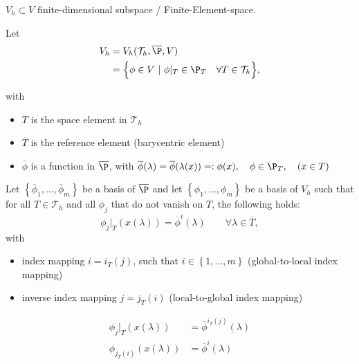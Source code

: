 $V_{h} \subset V$ finite-dimensional subspace / Finite-Element-space.

Let 
\begin{align*}
	V_{h} &= V_{h}(\mathcal{T}_{h}, \overline{\P}, V) \\
		  &= \Big\{  \phi \in V ~|~\phi |_{T} \in \P_{T}\quad\forall T \in \mathcal{T}_{h} \Big\}  ,
\end{align*}

with
\begin{itemize}
	\item $T$ is the space element in $\mathcal{T}_{h}$
	\item $\overline{T}$ is the reference element (barycentric element)
	\item $\overline{\phi }$ is a function in $\overline{\P}$, with $\overline{\phi }(\lambda ) = \overline{\phi }(\lambda (x)) =: \phi (x),\quad \phi  \in \P_{T},\quad (x \in T)$
\end{itemize}

Let $\left\{ \overline{\phi}_{1}, \ldots, \overline{\phi }_{m} \right\} $ be a basis of $\overline{\P}$ and let $\left\{ \phi _{1}, \ldots , \phi _{m} \right\}$ be a basis of $V_{h}$ such that for all $T \in \mathcal{T}_{h}$ and all $\phi _{j}$ that do not vanish on $T$, the following holds:
\[
	\phi _{j}|_{T}(x(\lambda )) = \overline{\phi }^{i}(\lambda ) \qquad \forall \lambda  \in \overline{T}
,\] 
with 
\begin{itemize}
	\item index mapping $ i= i_{T}(j)$, such that $i \in \left\{ 1, \ldots, m \right\} $ (global-to-local index mapping)
	\item inverse index mapping $j=j_{T}(i)$ (local-to-global index mapping)
\end{itemize}

\begin{align*}
	\phi _{j}|_{T}(x(\lambda )) &= \overline{\phi }^{i_{T}(j)}(\lambda ) \\
	\phi _{j_{T}(i)}(x(\lambda )) &= \overline{\phi }^{i}(\lambda )
\end{align*}

